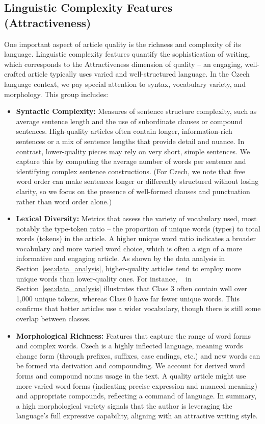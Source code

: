 \subsection{Linguistic Complexity Features (Attractiveness)}
One important aspect of article quality is the richness and complexity of its language. Linguistic complexity features quantify the sophistication of writing, which corresponds to the Attractiveness dimension of quality – an engaging, well-crafted article typically uses varied and well-structured language. In the Czech language context, we pay special attention to syntax, vocabulary variety, and morphology. This group includes:
\begin{itemize}
    \item \textbf{Syntactic Complexity:} Measures of sentence structure complexity, such as average sentence length and the use of subordinate clauses or compound sentences. High-quality articles often contain longer, information-rich sentences or a mix of sentence lengths that provide detail and nuance. In contrast, lower-quality pieces may rely on very short, simple sentences. We capture this by computing the average number of words per sentence and identifying complex sentence constructions. (For Czech, we note that free word order can make sentences longer or differently structured without losing clarity, so we focus on the presence of well-formed clauses and punctuation rather than word order alone.)
    \item \textbf{Lexical Diversity:} Metrics that assess the variety of vocabulary used, most notably the type-token ratio – the proportion of unique words (types) to total words (tokens) in the article. A higher unique word ratio indicates a broader vocabulary and more varied word choice, which is often a sign of a more informative and engaging article. As shown by the data analysis in Section~\ref{sec:data_analysis}, higher-quality articles tend to employ more unique words than lower-quality ones. For instance, ~ in Section~\ref{sec:data_analysis} illustrates that \ac{Class 3} often contain well over 1,000 unique tokens, whereas \ac{Class 0} have far fewer unique words. This confirms that better articles use a wider vocabulary, though there is still some overlap between classes.
    \item \textbf{Morphological Richness:} Features that capture the range of word forms and complex words. Czech is a highly inflected language, meaning words change form (through prefixes, suffixes, case endings, etc.) and new words can be formed via derivation and compounding. We account for derived word forms and compound nouns usage in the text. A quality article might use more varied word forms (indicating precise expression and nuanced meaning) and appropriate compounds, reflecting a command of language. In summary, a high morphological variety signals that the author is leveraging the language’s full expressive capability, aligning with an attractive writing style.
\end{itemize}

